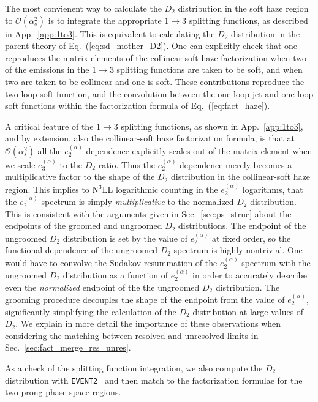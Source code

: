\documentclass[a4paper,11pt]{article}
\newcommand{\eventtwo}{\texttt{EVENT2}}
\newcommand{\ecf}[2]{e_{#1}^{(#2)}}
\DeclareRobustCommand{\Sec}[1]{Sec.~\ref{#1}}
\DeclareRobustCommand{\App}[1]{App.~\ref{#1}}
\DeclareRobustCommand{\Eq}[1]{Eq.~(\ref{#1})}
\begin{document}
The most convienent way to calculate the $D_2$ distribution in the soft haze region to $\mathcal{O}(\alpha_s^2)$ is to integrate the appropriate $1\to3$ splitting functions, as described in \App{app:1to3}. This is equivalent to calculating the $D_2$ distribution in the parent theory of \Eq{eq:sd_mother_D2}. One can explicitly check that one reproduces the matrix elements of the collinear-soft haze factorization when two of the emissions in the $1\to3$ splitting functions are taken to be soft, and when two are taken to be collinear and one is soft. These contributions reproduce the two-loop soft function, and the convolution between the one-loop jet and one-loop soft functions within the factorization formula of \Eq{eq:fact_haze}.

A critical feature of the  $1\to3$ splitting functions, as shown in \App{app:1to3}, and by extension, also the collinear-soft haze factorization formula, is that at $\mathcal{O}(\alpha_s^2)$ all the $\ecf{2}{\alpha}$ dependence explicitly scales out of the matrix element when we scale $\ecf{3}{\alpha}$ to the $D_2$ ratio. Thus the $\ecf{2}{\alpha}$ dependence merely becomes a multiplicative factor to the shape of the $D_2$ distribution in the collinear-soft haze region. This implies to N$^3$LL logarithmic counting in the $\ecf{2}{\alpha}$ logarithms, that the $\ecf{2}{\alpha}$ spectrum is simply \emph{multiplicative} to the normalized $D_2$ distribution. This is consistent with the arguments given in \Sec{sec:ps_struc} about the endpoints of the groomed and ungroomed $D_2$ distributions. The endpoint of the ungroomed $D_2$ distribution is set by the value of $\ecf{2}{\alpha}$ at fixed order, so the functional dependence of the ungroomed $D_2$ spectrum is highly nontrivial. One would have to convolve the Sudakov resummation of the $\ecf{2}{\alpha}$ spectrum with the ungroomed $D_2$ distribution as a function of $\ecf{2}{\alpha}$ in order to accurately describe even the \emph{normalized} endpoint of the the ungroomed $D_2$ distribution. The grooming procedure decouples the shape of the endpoint from the value of $\ecf{2}{\alpha}$, significantly simplifying the calculation of the $D_2$ distribution at large values of $D_2$. We explain in more detail the importance of these observations when considering the matching between resolved and unresolved limits in \Sec{sec:fact_merge_res_unres}.

As a check of the splitting function integration, we also compute the $D_2$ distribution with \eventtwo~\cite{Catani:1996vz} and then match to the factorization formulae for the two-prong phase space regions. 
\end{document}
